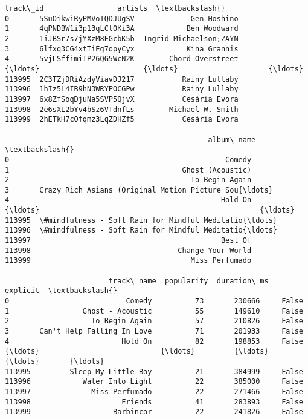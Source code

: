 \documentclass[11pt]{article}
\makeatletter
\newcommand{\boxspacing}{\kern\kvtcb@left@rule\kern\kvtcb@boxsep}
\newcommand{\prompt}[4]{
        {\ttfamily\llap{{\color{#2}[#3]:\hspace{3pt}#4}}\vspace{-\baselineskip}}
    }
\makeatother
\begin{document}
            \begin{tcolorbox}[breakable, size=fbox, boxrule=.5pt, pad at break*=1mm, opacityfill=0]
\prompt{Out}{outcolor}{64}{\boxspacing}
\begin{Verbatim}[commandchars=\\\{\}]
                      track\_id                 artists  \textbackslash{}
0       5SuOikwiRyPMVoIQDJUgSV             Gen Hoshino
1       4qPNDBW1i3p13qLCt0Ki3A            Ben Woodward
2       1iJBSr7s7jYXzM8EGcbK5b  Ingrid Michaelson;ZAYN
3       6lfxq3CG4xtTiEg7opyCyx            Kina Grannis
4       5vjLSffimiIP26QG5WcN2K        Chord Overstreet
{\ldots}                        {\ldots}                     {\ldots}
113995  2C3TZjDRiAzdyViavDJ217           Rainy Lullaby
113996  1hIz5L4IB9hN3WRYPOCGPw           Rainy Lullaby
113997  6x8ZfSoqDjuNa5SVP5QjvX           Cesária Evora
113998  2e6sXL2bYv4bSz6VTdnfLs        Michael W. Smith
113999  2hETkH7cOfqmz3LqZDHZf5           Cesária Evora

                                               album\_name  \textbackslash{}
0                                                  Comedy
1                                        Ghost (Acoustic)
2                                          To Begin Again
3       Crazy Rich Asians (Original Motion Picture Sou{\ldots}
4                                                 Hold On
{\ldots}                                                   {\ldots}
113995  \#mindfulness - Soft Rain for Mindful Meditatio{\ldots}
113996  \#mindfulness - Soft Rain for Mindful Meditatio{\ldots}
113997                                            Best Of
113998                                  Change Your World
113999                                     Miss Perfumado

                        track\_name  popularity  duration\_ms  explicit  \textbackslash{}
0                           Comedy          73       230666     False
1                 Ghost - Acoustic          55       149610     False
2                   To Begin Again          57       210826     False
3       Can't Help Falling In Love          71       201933     False
4                          Hold On          82       198853     False
{\ldots}                            {\ldots}         {\ldots}          {\ldots}       {\ldots}
113995         Sleep My Little Boy          21       384999     False
113996            Water Into Light          22       385000     False
113997              Miss Perfumado          22       271466     False
113998                     Friends          41       283893     False
113999                   Barbincor          22       241826     False


\end{Verbatim}
\end{tcolorbox}
\end{document}
